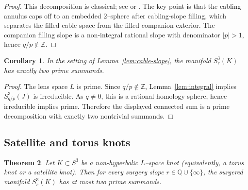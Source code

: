 \documentclass[11pt]{amsart}
\newtheorem{theorem}{Theorem}[section]
\newtheorem{corollary}[theorem]{Corollary}
\numberwithin{equation}{section}
\begin{document}
\begin{proof}
This decomposition is classical; see \cite[\S1]{How10} or \cite[\S1]{HLZ15}.
The key point is that the cabling annulus caps off to an embedded $2$--sphere after cabling-slope filling,
which separates the filled cable space from the filled companion exterior.
The companion filling slope is a non-integral rational slope with denominator $|p|>1$, hence $q/p\notin\mathbb{Z}$.
\end{proof}

\begin{corollary}\label{cor:cable-two-prime-summands}
In the setting of Lemma~\ref{lem:cable-slope}, the manifold $S^3_r(K)$ has exactly two prime summands.
\end{corollary}

\begin{proof}
The lens space $L$ is prime.  Since $q/p\notin\mathbb{Z}$, Lemma~\ref{lem:integral} implies
$S^3_{q/p}(J)$ is irreducible.  As $q\neq 0$, this is a rational homology sphere, hence irreducible implies prime.
Therefore the displayed connected sum is a prime decomposition with exactly two nontrivial summands.
\end{proof}

\subsection{Satellite and torus knots}

\begin{theorem}\label{thm:nonhyperbolic}
Let $K\subset S^3$ be a non-hyperbolic $L$--space knot (equivalently, a torus knot or a satellite knot).
Then for every surgery slope $r\in \mathbb{Q}\cup\{\infty\}$, the surgered manifold $S^3_r(K)$ has at most two
prime summands.
\end{theorem}
\end{document}
